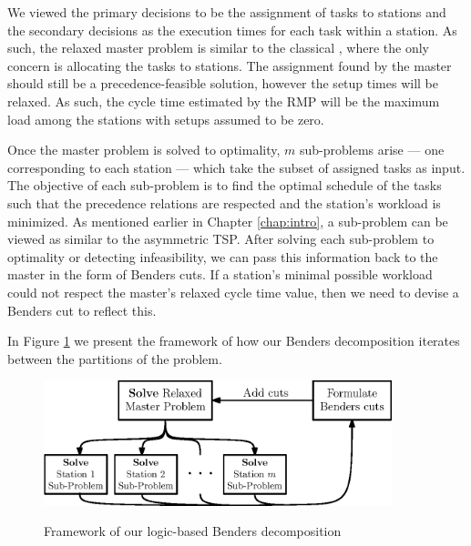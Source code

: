 We viewed the primary decisions to be the assignment
of tasks to stations and the secondary decisions
as the execution times for each task within a station.
As such, the relaxed master problem is similar to the classical
, where the only concern is allocating the tasks to 
stations.
The assignment found by the master should still
be a precedence-feasible solution, however the setup
times will be relaxed.
As such, the cycle time estimated by the 
RMP will be the maximum load among the stations
with setups assumed to be zero.

Once the master problem is solved to optimality,
$m$ sub-problems arise --- one corresponding to each station ---
which take the subset of assigned tasks as input.
The objective of each sub-problem is to find the optimal
schedule of the tasks such that the precedence relations
are respected and the station's workload is minimized.
As mentioned earlier in Chapter \ref{chap:intro},
a sub-problem can be viewed as similar to the asymmetric TSP.
After solving each sub-problem to optimality or detecting infeasibility,
we can pass this information 
back to the master in the form of Benders cuts.	
If a station's minimal possible workload could not respect the
master's relaxed cycle time value, then we need to devise
a Benders cut to reflect this.

In Figure \ref{fig:bend:highLevelBend} we present the framework
of how our Benders decomposition iterates between
the partitions of the problem.
\begin{figure}[tpb]
	\centering
	\caption{Framework of our logic-based Benders decomposition}
	\vspace{2mm}
	\includegraphics[width=0.9\textwidth]{images/ourHighLevelBenders.eps}
	\label{fig:bend:highLevelBend}
\end{figure}

